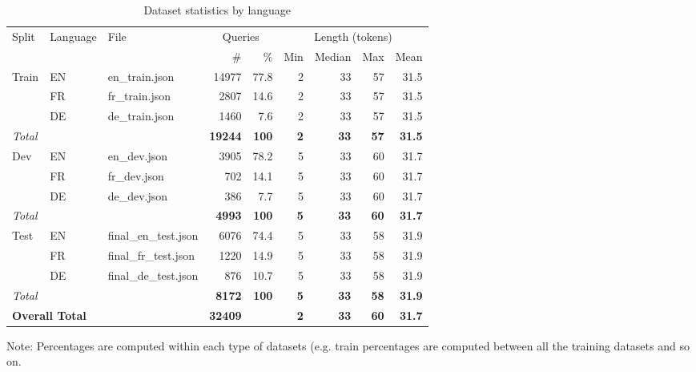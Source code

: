 \begin{table}[htbp]
\centering
\caption{Dataset statistics by language}
\label{tab:query_stats}
\begin{tabular}{l l l r r r r r r}
\toprule
\multirow{2}{*}{Split} & \multirow{2}{*}{Language} & \multirow{2}{*}{File} 
& \multicolumn{2}{c}{Queries} 
& \multicolumn{4}{c}{Length (tokens)} \\
\cmidrule(lr){4-5} \cmidrule(lr){6-9}
& & & \# & \% & Min & Median & Max & Mean \\
\midrule

\multirow{3}{*}{Train}
& EN & en\_train.json & 14977 & 77.8 & 2 & 33 & 57 & 31.5 \\
& FR & fr\_train.json & 2807  & 14.6 & 2 & 33 & 57 & 31.5 \\
& DE & de\_train.json & 1460  & 7.6  & 2 & 33 & 57 & 31.5 \\
\textit{Total} & & & \textbf{19244} & \textbf{100} & \textbf{2} & \textbf{33} & \textbf{57} & \textbf{31.5} \\

\midrule

\multirow{3}{*}{Dev}
& EN & en\_dev.json & 3905 & 78.2 & 5 & 33 & 60 & 31.7 \\
& FR & fr\_dev.json & 702  & 14.1 & 5 & 33 & 60 & 31.7 \\
& DE & de\_dev.json & 386  & 7.7  & 5 & 33 & 60 & 31.7 \\
\textit{Total} & & & \textbf{4993} & \textbf{100} & \textbf{5} & \textbf{33} & \textbf{60} & \textbf{31.7} \\

\midrule

\multirow{3}{*}{Test}
& EN & final\_en\_test.json & 6076 & 74.4 & 5 & 33 & 58 & 31.9 \\
& FR & final\_fr\_test.json & 1220 & 14.9 & 5 & 33 & 58 & 31.9 \\
& DE & final\_de\_test.json & 876  & 10.7 & 5 & 33 & 58 & 31.9 \\
\textit{Total} & & & \textbf{8172} & \textbf{100} & \textbf{5} & \textbf{33} & \textbf{58} & \textbf{31.9} \\

\midrule

\multicolumn{3}{l}{\textbf{Overall Total}} 
& \textbf{32409} & & \textbf{2} & \textbf{33} & \textbf{60} & \textbf{31.7} \\

\bottomrule
\end{tabular}

\vspace{2mm}
\small{Note: Percentages are computed within each type of datasets (e.g. train percentages are computed between all the training datasets and so on.}
\end{table}

